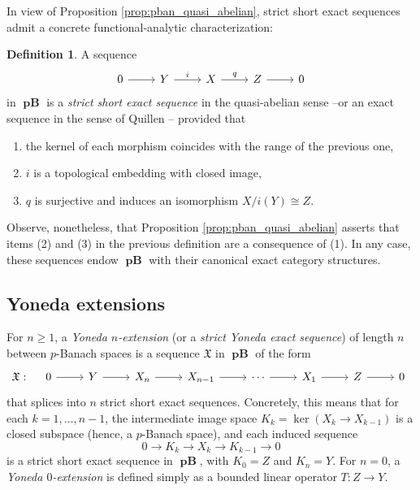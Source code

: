 \documentclass[12pt,a4paper]{amsproc}
\theoremstyle{remark}
\theoremstyle{definition}
\newtheorem{defi}[thm]{Definition}
\newcommand{\QBan}{\operatorname{\textbf{QB}}}
\newcommand{\pBan}{\operatorname{\textbf{pB}}}
\numberwithin{equation}{section}
\begin{document}


In view of Proposition \ref{prop:pban_quasi_abelian}, strict short exact sequences admit a concrete functional-analytic characterization:

\begin{defi}
	A sequence
	\[
	\begin{tikzcd}
		0 \arrow[r] & Y \arrow[r, "i"] & X \arrow[r, "q"] & Z \arrow[r] & 0
	\end{tikzcd}
	\]
	in $\boldsymbol{\pBan}$ is a \emph{strict short exact sequence} in the quasi-abelian sense --or an exact sequence in the sense of Quillen \cite{quillen1973}-- provided that 
    \begin{enumerate}
        \item the kernel of each morphism coincides with the range of the previous one, 
        \item $i$ is a topological embedding with closed image,
        \item $q$ is surjective and induces an isomorphism $X / i(Y) \cong Z$.
    \end{enumerate}  
\end{defi}
Observe, nonetheless, that Proposition \ref{prop:pban_quasi_abelian} asserts that items (2) and (3) in the previous definition are a consequence of (1). In any case, these sequences endow $\boldsymbol{\pBan}$ with their canonical exact category structures.



\subsection{Yoneda extensions}\label{sec:pre_2.3}

For $n \ge 1$, a \emph{Yoneda $n$-extension} (or a \emph{strict Yoneda exact sequence}) of length $n$ between $p$-Banach spaces is a sequence $\mathfrak{X}$ in $\boldsymbol{\pBan}$ of the form
\begin{equation} \label{next}
\mathfrak{X}: \quad
\begin{tikzcd}
	0 \arrow[r] & Y \arrow[r] & X_n \arrow[r] & X_{n-1} \arrow[r] & \cdots \arrow[r] & X_1 \arrow[r] & Z \arrow[r] & 0
\end{tikzcd}
\end{equation}
that splices into $n$ strict short exact sequences. Concretely, this means that for each $k = 1, \dots, n-1$, the intermediate image space $K_k = \ker(X_k \to X_{k-1})$ is a closed subspace (hence, a $p$-Banach space), and each induced sequence 
\[
0 \longrightarrow K_k \longrightarrow X_k \longrightarrow K_{k-1} \longrightarrow 0
\]
is a strict short exact sequence in $\boldsymbol{\pBan}$, with $K_0 = Z$ and $K_n = Y$. For $n=0$, a \emph{Yoneda $0$-extension} is defined simply as a bounded linear operator $T: Z \to Y$.
 
\end{document}
